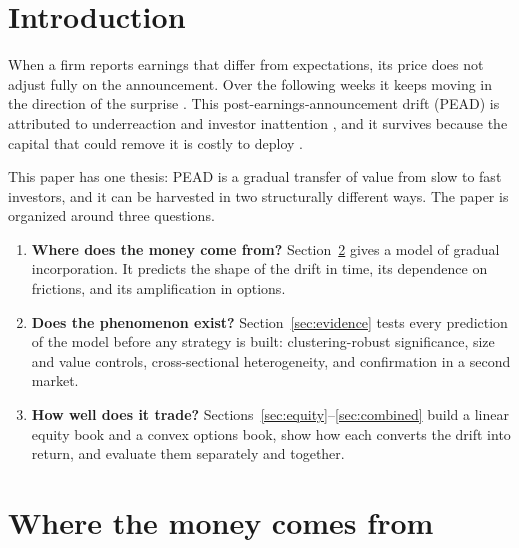 \documentclass[11pt]{article}
\theoremstyle{definition}
\newcommand{\1}{\mathbf{1}}
\begin{document}
\tableofcontents
\newpage

\section{Introduction}

When a firm reports earnings that differ from expectations, its price does not adjust
fully on the announcement. Over the following weeks it keeps moving in the direction of the
surprise \citep{BallBrown1968,BernardThomas1989,BernardThomas1990}. This post-earnings-announcement
drift (PEAD) is attributed to underreaction and investor inattention
\citep{HongStein1999,HirshleiferLimTeoh2009,DellaVignaPollet2009}, and it survives because
the capital that could remove it is costly to deploy \citep{ShleiferVishny1997,Mendenhall2004}.

This paper has one thesis: PEAD is a gradual transfer of value from slow to fast
investors, and it can be harvested in two structurally different ways. The paper is organized
around three questions.
\begin{enumerate}[label=(\roman*)]
  \item \textbf{Where does the money come from?} Section~\ref{sec:mechanism} gives a model
        of gradual incorporation. It predicts the shape of the drift in time, its dependence
        on frictions, and its amplification in options.
  \item \textbf{Does the phenomenon exist?} Section~\ref{sec:evidence} tests every prediction
        of the model before any strategy is built: clustering-robust significance, size and
        value controls, cross-sectional heterogeneity, and confirmation in a second market.
  \item \textbf{How well does it trade?} Sections~\ref{sec:equity}--\ref{sec:combined} build
        a linear equity book and a convex options book, show how each converts the drift
        into return, and evaluate them separately and together.
\end{enumerate}

\section{Where the money comes from}\label{sec:mechanism}
\end{document}
